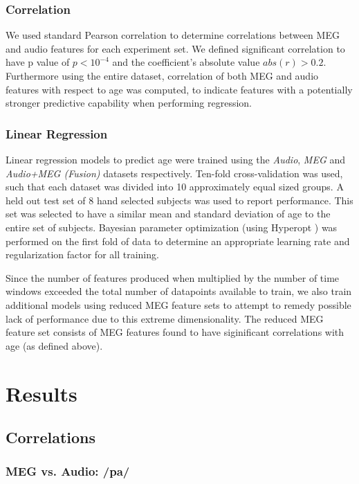 \documentclass[a4paper]{article}
\begin{document}
\subsubsection{Correlation}

We used standard Pearson correlation to determine correlations between MEG and audio features for each experiment set. We defined significant correlation to have p value of $p < 10^{-4}$ and the coefficient's absolute value $abs(r) > 0.2$.  Furthermore using the entire dataset, correlation of both MEG and audio features with respect to age was computed, to indicate features with a potentially stronger predictive capability when performing regression.

\subsubsection{Linear Regression}

Linear regression models to predict age were trained using the \textit{Audio}, \textit{MEG} and \textit{Audio+MEG (Fusion)} datasets respectively. Ten-fold cross-validation was used, such that each dataset was divided into 10 approximately equal sized groups. A held out test set of 8 hand selected subjects was used to report performance. This set was selected to have a similar mean and standard deviation of age to the entire set of subjects. Bayesian parameter optimization (using Hyperopt \cite{Bergstra2013}) was performed on the first fold of data to determine an appropriate learning rate and regularization factor for all training.

Since the number of features produced when multiplied by the number of time windows exceeded the total number of datapoints available to train, we also train additional models using reduced MEG feature sets to attempt to remedy possible lack of performance due to this extreme dimensionality. The reduced MEG feature set consists of MEG features found to have siginificant correlations with age (as defined above).

\section{Results}

\subsection{Correlations}

\subsubsection{MEG vs. Audio: /pa/}
\end{document}
